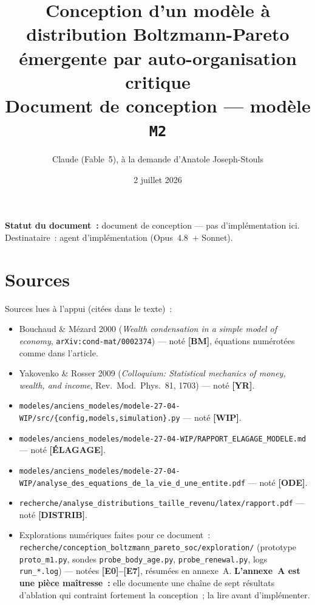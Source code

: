 \documentclass[11pt,a4paper]{article}
\title{Conception d'un modèle à distribution Boltzmann-Pareto\\[2pt]
émergente par auto-organisation critique\\[6pt]
\large Document de conception --- modèle \texttt{M2}}
\author{Claude (Fable~5), à la demande d'Anatole Joseph-Stouls}
\date{2 juillet 2026}
\begin{document}
\maketitle

\begin{center}
\begin{minipage}{0.86\linewidth}
\small\centering
\textbf{Statut du document~:} document de conception --- pas d'implémentation ici.\\
Destinataire~: agent d'implémentation (Opus~4.8~+ Sonnet).
\end{minipage}
\end{center}

\bigskip

\section*{Sources}

Sources lues à l'appui (citées dans le texte)~:

\begin{itemize}
  \item Bouchaud \& Mézard 2000 (\emph{Wealth condensation in a simple model of economy}, \texttt{arXiv:cond-mat/0002374}) --- noté \textbf{[BM]}, équations numérotées comme dans l'article.
  \item Yakovenko \& Rosser 2009 (\emph{Colloquium: Statistical mechanics of money, wealth, and income}, Rev.~Mod.~Phys.~81, 1703) --- noté \textbf{[YR]}.
  \item \texttt{modeles/anciens_modeles/modele-27-04-WIP/src/\{config,models,simulation\}.py} --- noté \textbf{[WIP]}.
  \item \texttt{modeles/anciens_modeles/modele-27-04-WIP/RAPPORT_ELAGAGE_MODELE.md} --- noté \textbf{[ÉLAGAGE]}.
  \item \texttt{modeles/anciens_modeles/modele-27-04-WIP/analyse_des_equations_de_la_vie_d_une_entite.pdf} --- noté \textbf{[ODE]}.
  \item \texttt{recherche/analyse_distributions_taille_revenu/latex/rapport.pdf} --- noté \textbf{[DISTRIB]}.
  \item Explorations numériques faites pour ce document~: \texttt{recherche/conception_boltzmann_pareto_soc/exploration/} (prototype \texttt{proto_m1.py}, sondes \texttt{probe_body_age.py}, \texttt{probe_renewal.py}, logs \texttt{run_*.log}) --- notées \textbf{[E0]--[E7]}, résumées en annexe~A. \textbf{L'annexe~A est une pièce maîtresse~:} elle documente une chaîne de sept résultats d'ablation qui contraint fortement la conception~; la lire avant d'implémenter.
\end{itemize}
\end{document}
